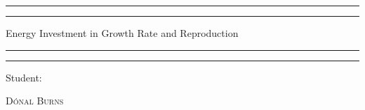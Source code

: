 \usepackage[compact]{titlesec} %





 

\begin{titlepage} %

	\centering %
	
	\scshape %
	
	\vspace*{\baselineskip} %
	
	
	\rule{\textwidth}{1.6pt}\vspace*{-\baselineskip}\vspace*{2pt} %
	\rule{\textwidth}{0.4pt} %
	
	\vspace{0.75\baselineskip} %
	
	{\LARGE Energy Investment in Growth Rate and Reproduction\\} %
	
	\vspace{0.75\baselineskip} %
	
	\rule{\textwidth}{0.4pt}\vspace*{-\baselineskip}\vspace{3.2pt} %
	\rule{\textwidth}{1.6pt} %
	
	\vspace{2\baselineskip} %
	
	
		Student:
	
	
	\vspace{0.5\baselineskip} %
	
	{\scshape\Large D\'onal Burns  \\} %
	

\end{titlepage}
